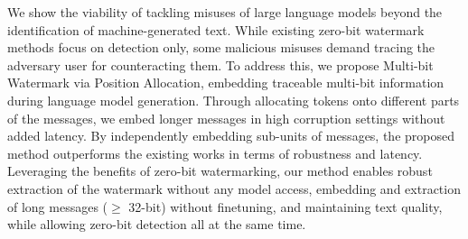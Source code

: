 We show the viability of tackling misuses of large language models beyond the identification of machine-generated text. While existing zero-bit watermark methods focus on detection only, some malicious misuses demand tracing the adversary user for counteracting them. To address this, we propose Multi-bit Watermark via Position Allocation, embedding traceable multi-bit information during language model generation. Through allocating tokens onto different parts of the messages, we embed longer messages in high corruption settings without added latency. By independently embedding sub-units of messages, the proposed method outperforms the existing works in terms of robustness and latency. Leveraging the benefits of zero-bit watermarking, our method enables robust extraction of the watermark without any model access, embedding and extraction of long messages ($\geq$ 32-bit) without finetuning, and maintaining text quality, while allowing zero-bit detection all at the same time.